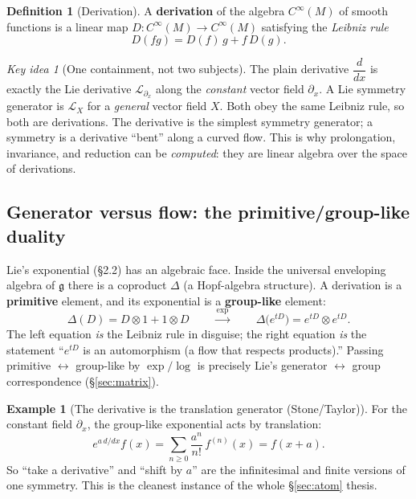 \documentclass[11pt]{article}
\theoremstyle{definition}
\newtheorem{definition}{Definition}[section]
\newtheorem{example}{Example}[section]
\theoremstyle{remark}
\newtheorem*{keyidea}{Key idea}
\newcommand{\g}{\mathfrak{g}}
\begin{document}
\begin{definition}[Derivation]
A \textbf{derivation} of the algebra $C^\infty(M)$ of smooth functions is a linear map
$D:C^\infty(M)\to C^\infty(M)$ satisfying the \emph{Leibniz rule}
\[
D(fg)=D(f)\,g+f\,D(g).
\]
\end{definition}

\begin{keyidea}[One containment, not two subjects]
The plain derivative $\dfrac{d}{dx}$ is exactly the Lie derivative $\mathcal{L}_{\partial_x}$ along the
\emph{constant} vector field $\partial_x$. A Lie symmetry generator is $\mathcal{L}_X$ for a
\emph{general} vector field $X$. Both obey the same Leibniz rule, so both are derivations. The
derivative is the simplest symmetry generator; a symmetry is a derivative ``bent'' along a curved
flow. This is why prolongation, invariance, and reduction can be \emph{computed}: they are linear
algebra over the space of derivations.
\end{keyidea}

\subsection{Generator versus flow: the primitive/group-like duality}

Lie's exponential (\S2.2) has an algebraic face. Inside the universal enveloping algebra of $\g$
there is a coproduct $\Delta$ (a Hopf-algebra structure). A derivation is a \textbf{primitive}
element, and its exponential is a \textbf{group-like} element:
\[
\Delta(D)=D\otimes 1+1\otimes D
\qquad\xrightarrow{\ \exp\ }\qquad
\Delta\!\big(e^{tD}\big)=e^{tD}\otimes e^{tD}.
\]
The left equation \emph{is} the Leibniz rule in disguise; the right equation \emph{is} the statement
``$e^{tD}$ is an automorphism (a flow that respects products).'' Passing primitive $\leftrightarrow$
group-like by $\exp/\log$ is precisely Lie's generator $\leftrightarrow$ group correspondence
(\S\ref{sec:matrix}).

\begin{example}[The derivative is the translation generator (Stone/Taylor)]
For the constant field $\partial_x$, the group-like exponential acts by translation:
\[
e^{a\,d/dx} f(x)=\sum_{n\ge0}\frac{a^n}{n!}\,f^{(n)}(x)=f(x+a).
\]
So ``take a derivative'' and ``shift by $a$'' are the infinitesimal and finite versions of one
symmetry. This is the cleanest instance of the whole \S\ref{sec:atom} thesis.
\end{example}
\end{document}
